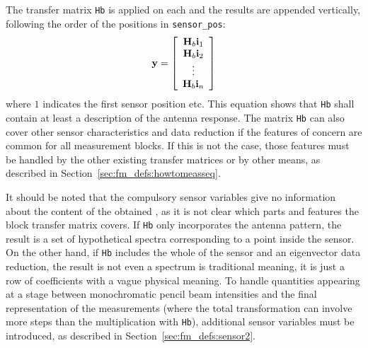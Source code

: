 The transfer matrix \verb|Hb| is applied on each  and the
results are appended vertically, following the order of the positions
in \verb|sensor_pos|:
\begin{equation}
  \mathbf{y} = \left[ \begin{array}{c} \mathbf{H}_{b}\mathbf{i}_{1} \\ 
                                    \mathbf{H}_{b}\mathbf{i}_{2} \\
                                    \vdots                  \\
                                    \mathbf{H}_{b}\mathbf{i}_{n} \end{array} \right]
  \label{eq:fm_defs:measseq}
\end{equation}
where $1$ indicates the first sensor position etc. This equation shows
that \verb|Hb| shall contain at least a description of the antenna
response. The matrix \verb|Hb| can also cover other sensor
characteristics and data reduction if the features of concern are
common for all measurement blocks. If this is not the case, those
features must be handled by the other existing transfer matrices or by
other means, as described in Section~\ref{sec:fm_defs:howtomeasseq}.

It should be noted that the compulsory sensor variables give no
information about the content of the obtained \MsrVct, as it is not
clear which parts and features the block transfer matrix covers. If
\verb|Hb| only incorporates the antenna pattern, the result is a set
of hypothetical spectra corresponding to a point inside the sensor. On
the other hand, if \verb|Hb| includes the whole of the sensor and an
eigenvector data reduction, the result is not even a spectrum is
traditional meaning, it is just a row of coefficients with a vague
physical meaning. To handle quantities appearing at a stage between
monochromatic pencil beam intensities and the final representation of
the measurements (where the total transformation can involve more
steps than the multiplication with \verb|Hb|), additional sensor
variables must be introduced, as described in
Section~\ref{sec:fm_defs:sensor2}.


\label{sec:fm_defs:rte}

\newcommand{\Int}{{\bf I}}
\newcommand{\Ext}{{\bf K}}
\newcommand{\Abs}{{\bf a}}
\newcommand{\Sca}{{\bf Y}}
\newcommand{\Dir}{{\bf n}}
\newcommand{\Path}{{\bf s}}
\newcommand{\Freq}{\nu}
\newcommand{\Dep}{(\Dir,\Freq)}

